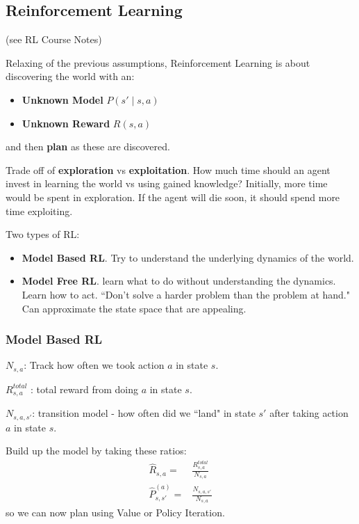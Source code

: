 \documentclass[11pt, oneside]{article}   	%
\begin{document}
\subsection{Reinforcement Learning}

(see RL Course Notes)

Relaxing of the previous assumptions, Reinforcement Learning is about discovering the world with an:
\begin{itemize} \itemsep5pt
	\item \textbf{Unknown Model}	$P(s' \mid s,a)$
	\item \textbf{Unknown Reward} $R(s,a)$
\end{itemize}
and then \textbf{plan} as these are discovered.

Trade off of \textbf{exploration} vs \textbf{exploitation}. How much time should an agent invest in learning the world vs using gained knowledge? Initially, more time would be spent in exploration. If the agent will die soon, it should spend more time exploiting.

Two types of RL:
\begin{itemize}
	\item \textbf{Model Based RL}. Try to understand the underlying dynamics of the world.
	\item \textbf{Model Free RL}. learn what to do without understanding the dynamics. Learn how to act. ``Don't solve a harder problem than the problem at hand." Can approximate the state space that are appealing.
\end{itemize}

\subsubsection{Model Based RL}

$N_{s,a}$: Track how often we took action $a$ in state $s$.

$R_{s,a}^{total}$ : total reward from doing $a$ in state $s$.

$N_{s,a,s'}$: transition model - how often did we ``land" in state $s'$ after taking action $a$ in state $s$.

Build up the model by taking these ratios:
\begin{align}
\hat{R}_{s,a} = & \frac{R_{s,a}^{total}} {N_{s,a}} \\
\hat{P}_{s,s'}^{(a)} = & \frac{N_{s,a,s'}} {N_{s,a}}
\end{align}
so we can now plan using Value or Policy Iteration.
\end{document}
